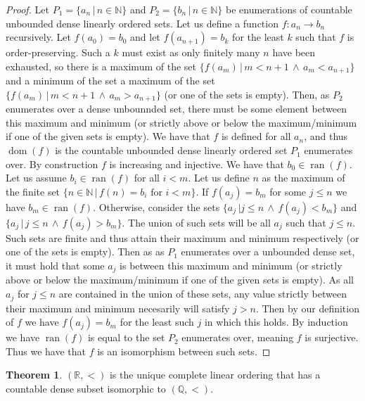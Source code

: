 \documentclass{article}
\theoremstyle{definition}
\newtheorem{thm}{Theorem}[section]
\newcommand{\N}{\mathbb{N}}
\newcommand{\Q}{\mathbb{Q}}
\newcommand{\R}{\mathbb{R}}
\DeclareMathOperator{\ran}{ran}
\DeclareMathOperator{\dom}{dom}
\begin{document}
\begin{proof}
    Let $P_1 = \{a_n \, | \, n \in \N\}$ and $P_2 = \{b_n \, | \, n \in \N\}$ be enumerations of countable unbounded dense linearly ordered sets. Let us define a function $f: a_n \to b_n$ recursively. Let $f(a_0) = b_0$ and let $f(a_{n + 1}) = b_k$ for the least $k$ such that $f$ is order-preserving. Such a $k$ must exist as only finitely many $n$ have been exhausted, so there is a maximum of the set $\{f(a_m) \, | \, m < n + 1 \, \land \, a_m < a_{n + 1}\}$ and a minimum of the set a maximum of the set $\{f(a_m) \, | \, m < n + 1 \, \land \, a_m > a_{n + 1}\}$ (or one of the sets is empty). Then, as $P_2$ enumerates over a dense unbounnded set, there must be some element between this maximum and minimum (or strictly above or below the maximum/minimum if one of the given sets is empty). We have that $f$ is defined for all $a_n$, and thus $\dom(f)$ is the countable unbounded dense linearly ordered set $P_1$ enumerates over. By construction $f$ is increasing and injective. We have that $b_0 \in \ran(f)$. Let us assume $b_i \in \ran(f)$ for all $i < m$.  Let us define $n$ as the maximum of the finite set $\{n \in \N \, | \, f(n) = b_i \text{ for } i < m\}$. If $f(a_j) = b_m$ for some $j \le n$ we have $b_m \in \ran(f)$. Otherwise, consider the sets $\{a_j \, | j \le n \, \land \, f(a_j) < b_m\}$ and  $\{a_j \, | \, j \le n \, \land \, f(a_j) > b_m\}$. The union of such sets will be all $a_j$ such that $j \le n$. Such sets are finite and thus attain their maximum and minimum respectively (or one of the sets is empty). Then as as $P_1$ enumerates over a unbounded dense set, it must hold that some $a_j$ is between this maximum and minimum (or strictly above or below the maximum/minimum if one of the given sets is empty). As all $a_j$ for $j \le n$ are contained in the union of these sets, any value strictly between their maximum and minimum necesarily will satisfy $j > n$. Then by our definition of $f$ we have $f(a_j) = b_m$ for the least such $j$ in which this holds. By induction we have $\ran(f)$ is equal to the set $P_2$ enumerates over, meaning $f$ is surjective. Thus we have that $f$ is an isomorphism between such sets.
\end{proof}

\begin{thm}
    $(\R, <)$ is the unique complete linear ordering that has a countable dense subset isomorphic to $(\Q, <)$.
\end{thm}
\end{document}
